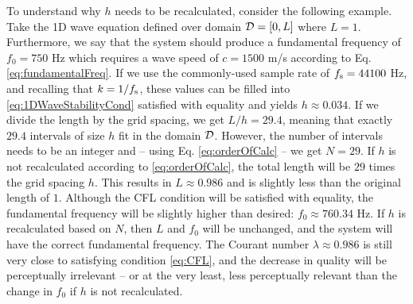 To understand why $h$ needs to be recalculated, consider the following example. Take the 1D wave equation defined over domain $\mathcal{D} = [0, L]$ where $L = 1$. Furthermore, we say that the system should produce a fundamental frequency of $f_0 = 750$ Hz which requires a wave speed of $c = 1500$ m/s according to Eq. \eqref{eq:fundamentalFreq}. If we use the commonly-used sample rate of $f_\text{s} = 44100$ Hz, and recalling that $k = 1/f_\text{s}$, these values can be filled into \eqref{eq:1DWaveStabilityCond} satisfied with equality and yields $h \approx 0.034$. If we divide the length by the grid spacing, we get $L / h = 29.4$, meaning that exactly $29.4$ intervals of size $h$ fit in the domain $\mathcal{D}$. However, the number of intervals needs to be an integer and -- using Eq. \eqref{eq:orderOfCalc} -- we get $N = 29$. If $h$ is not recalculated according to \eqref{eq:orderOfCalc}, the total length will be $29$ times the grid spacing $h$. This results in $L \approx 0.986$ and is slightly less than the original length of $1$. Although the CFL condition will be satisfied with equality, the fundamental frequency will be slightly higher than desired: $f_0 \approx 760.34$ Hz. If $h$ is recalculated based on $N$, then $L$ and $f_0$ will be unchanged, and the system will have the correct fundamental frequency. The Courant number $\lambda \approx 0.986$ is still very close to satisfying condition \eqref{eq:CFL}, and the decrease in quality will be perceptually irrelevant -- or at the very least, less perceptually relevant than the change in $f_0$ if $h$ is not recalculated.



